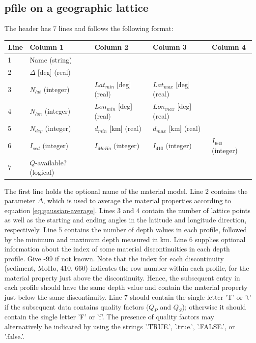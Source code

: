 \documentclass[11pt]{report}
\begin{document}
\subsection{pfile on a geographic lattice}
The header has 7 lines and follows the following format:
\begin{center}
\begin{tabular}{lllll}\hline
Line & Column 1& Column 2& Column 3& Column 4\\ \hline
1 & Name (string) & & & \\ \hline
2 & $\Delta$ [deg] (real) & & & \\ \hline
3 & $N_{lat}$ (integer) & $Lat_{min}$ [deg] (real) & $Lat_{max}$ [deg] (real) & \\ \hline
4 & $N_{lon}$ (integer) & $Lon_{min}$ [deg] (real) & $Lon_{max}$ [deg] (real) & \\ \hline
5 & $N_{dep}$ (integer) & $d_{min}$ [km] (real) & $d_{max}$ [km] (real) & \\ \hline
6 & $I_{sed}$ (integer) & $I_{MoHo}$ (integer) & $I_{410}$ (integer) & $I_{660}$ (integer) \\ \hline
7 & $Q$-available? (logical) \\ \hline
\end{tabular}
\end{center}
The first line holds the optional name of the material model. Line 2 contains the parameter
$\Delta$, which is used to average the material properties according to equation \eqref{eq:gaussian-average}.
Lines 3 and 4 contain the number of lattice points as well as the starting and ending angles in the
latitude and longitude direction, respectively. Line 5 contains the number of depth values in each
profile, followed by the minimum and maximum depth measured in km. Line 6 supplies optional
information about the index of some material discontinuities in each depth profile. Give -99 if not
known. Note that the index for each discontinuity (sediment, MoHo, 410, 660) indicates the row
number within each profile, for the material property just above the discontinuity. Hence, the
subsequent entry in each profile should have the same depth value and contain the material property
just below the same discontinuity. Line 7 should contain the single letter 'T' or 't' if the
subsequent data contains quality factors ($Q_P$ and $Q_S$); otherwise it should contain the single
letter 'F' or 'f'. The presence of quality factors may alternatively be indicated by using the
strings '.TRUE.', '.true.', '.FALSE.', or '.false.'. 
\end{document}
